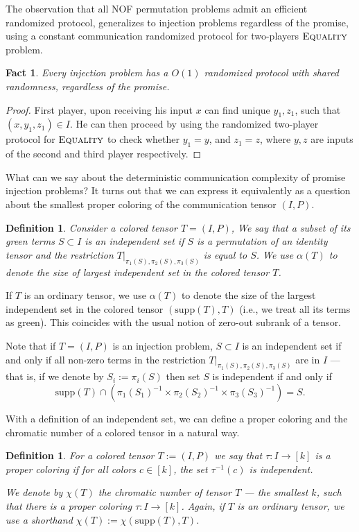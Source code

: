 \documentclass[10pt,a4paper]{article}
\newtheorem{definition}[theorem]{Definition}
\newtheorem{fact}[theorem]{Fact}
\newcommand{\supp}{\mathrm{supp}}
\begin{document}
The observation that all NOF permutation problems admit an efficient randomized protocol, generalizes to injection problems regardless of the promise, using a constant communication randomized protocol for two-players $\textsc{Equality}$ problem.
\begin{fact}
Every injection problem has a $O(1)$ randomized protocol with shared randomness, regardless of the promise.
\end{fact}
\begin{proof}
First player, upon receiving his input $x$ can find unique $y_1, z_1$, such that $(x,y_1, z_1) \in I$. He can then proceed by using the randomized two-player protocol for $\textsc{Equality}$ to check whether $y_1 = y$, and $z_1 = z$, where $y,z$ are inputs of the second and third player respectively.
\end{proof}

What can we say about the deterministic communication complexity of promise injection problems? It turns out that we can express it equivalently as a question about the smallest proper coloring of the communication tensor $(I, P)$.
\begin{definition}
Consider a colored tensor $T = (I, P)$, We say that a subset of its green terms $S \subset I$ is an independent set if $S$ is a permutation of an identity tensor and the restriction $T|_{\pi_1(S), \pi_2(S), \pi_3(S)}$ is equal to $S$. We use $\alpha(T)$ to denote the size of largest independent set in the colored tensor $T$.
\end{definition}

If $T$ is an ordinary tensor, we use $\alpha(T)$ to denote the size of the largest independent set in the colored tensor $(\supp(T), T)$ (i.e., we treat all its terms as green). This coincides with the usual notion of zero-out subrank of a tensor.

Note that if $T = (I, P)$ is an injection problem, $S \subset I$ is an independent set if and only if all non-zero terms in the restriction $T|_{\pi_1(S), \pi_2(S), \pi_3(S)}$ are in $I$ --- that is, if we denote by $S_i := \pi_i(S)$ then set $S$ is independent if and only if 
\begin{equation*}
    \supp(T) \cap (\pi_1(S_1)^{-1} \times \pi_2(S_2)^{-1} \times \pi_3(S_3)^{-1}) = S.
\end{equation*}

With a definition of an independent set, we can define a proper coloring and the chromatic number of a colored tensor in a natural way.
\begin{definition}
For a colored tensor $T := (I, P)$  we say that $\tau : I \to [k]$ is a proper coloring if for all colors $c\in [k]$, the set $\tau^{-1}(c)$ is independent.

We denote by $\chi(T)$ the \emph{chromatic number} of tensor $T$ --- the smallest $k$, such that there is a proper coloring $\tau : I \to [k]$. Again, if $T$ is an ordinary tensor, we use a shorthand $\chi(T) := \chi(\supp(T), T)$.
\end{definition}
\end{document}
